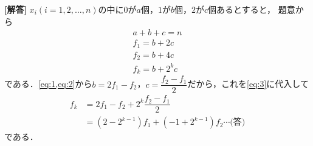 \documentclass[../../main.tex]{subfiles}
\begin{document}
\begin{oframed}
  
\end{oframed}

{\bf [解答]} $x_i(i=1,2,\dots,n)$の中に$0$が$a$個，$1$が$b$個，$2$が$c$個あるとすると，
題意から
\begin{align}
  a+b+c=n \\
  f_1=b+2c \label{eq:1}\\
  f_2=b+4c  \label{eq:2}\\
  f_k=b+2^kc \label{eq:3}
\end{align}
である．\cref{eq:1,eq:2}から$b=2f_1-f_2$，$c=\dfrac{f_2-f_1}{2}$だから，これを\cref{eq:3}に代入して
\begin{align}
  f_k&=2f_1-f_2+2^k\dfrac{f_2-f_1}{2} \\
  &=(2-2^{k-1})f_1+(-1+2^{k-1})f_2\cdots\text{(答)}
\end{align}
である．
\newpage
\end{document}
